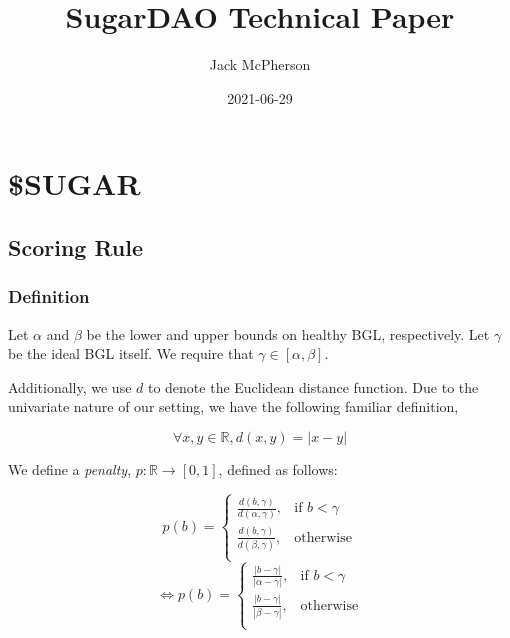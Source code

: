 \documentclass[oneside,a4paper]{article}
\theoremstyle{remark}
\begin{document}
   \title{SugarDAO Technical Paper}
    \author{Jack McPherson}
    \date{2021-06-29}
    \maketitle

    \section{\$SUGAR}
        \subsection{Scoring Rule}
            \subsubsection{Definition}
                Let \(\alpha\) and \(\beta\) be the lower and upper bounds on healthy BGL, respectively. Let \(\gamma\) be the ideal BGL itself. We require that \(\gamma\in [\alpha,\beta]\).
                
                Additionally, we use \(d\) to denote the Euclidean distance function. Due to the univariate nature of our setting, we have the following familiar definition,
        
                \[
                    \forall x, y\in\mathbb{R}, d\left(x, y\right)=|x-y|
                \]
        
                We define a \textit{penalty}, \(p:\mathbb{R}\rightarrow [0, 1]\), defined as follows:
        
                \[
                    p\left(b\right)=\left.
                        \begin{cases}
                            \frac{d\left(b, \gamma\right)}{d\left(\alpha, \gamma\right)}, & \text{if } b<\gamma\\
                            \frac{d\left(b, \gamma\right)}{d\left(\beta, \gamma\right)}, & \text{otherwise}\\
                        \end{cases}\right.
                \]
                \[
                    \Leftrightarrow p\left(b\right)=\left.
                        \begin{cases}
                            \frac{|b-\gamma|}{|\alpha-\gamma|}, & \text{if } b<\gamma\\
                            \frac{|b-\gamma|}{|\beta-\gamma|}, & \text{otherwise}\\
                        \end{cases}\right.
                \]
    
\end{document}
